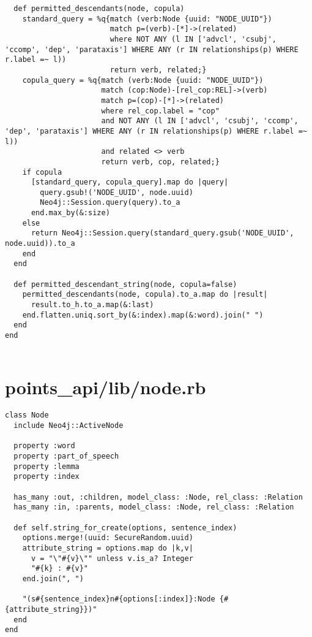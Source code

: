 \documentclass{article}
\begin{document}
\begin{verbatim}
  def permitted_descendants(node, copula)
    standard_query = %q{match (verb:Node {uuid: "NODE_UUID"})
                        match p=(verb)-[*]->(related)
                        where NOT ANY (l IN ['advcl', 'csubj', 'ccomp', 'dep', 'parataxis'] WHERE ANY (r IN relationships(p) WHERE r.label =~ l))
                        return verb, related;}
    copula_query = %q{match (verb:Node {uuid: "NODE_UUID"})
                      match (cop:Node)-[rel_cop:REL]->(verb)
                      match p=(cop)-[*]->(related)
                      where rel_cop.label = "cop"
                      and NOT ANY (l IN ['advcl', 'csubj', 'ccomp', 'dep', 'parataxis'] WHERE ANY (r IN relationships(p) WHERE r.label =~ l))
                      and related <> verb
                      return verb, cop, related;}
    if copula
      [standard_query, copula_query].map do |query|
        query.gsub!('NODE_UUID', node.uuid)
        Neo4j::Session.query(query).to_a
      end.max_by(&:size)
    else
      return Neo4j::Session.query(standard_query.gsub('NODE_UUID', node.uuid)).to_a
    end
  end

  def permitted_descendant_string(node, copula=false)
    permitted_descendants(node, copula).to_a.map do |result|
      result.to_h.to_a.map(&:last)
    end.flatten.uniq.sort_by(&:index).map(&:word).join(" ")
  end
end


\end{verbatim}
\pagebreak

\section*{points\_api/lib/node.rb}
\begin{verbatim}
class Node
  include Neo4j::ActiveNode

  property :word
  property :part_of_speech
  property :lemma
  property :index

  has_many :out, :children, model_class: :Node, rel_class: :Relation
  has_many :in, :parents, model_class: :Node, rel_class: :Relation

  def self.string_for_create(options, sentence_index)
    options.merge!(uuid: SecureRandom.uuid)
    attribute_string = options.map do |k,v|
      v = "\"#{v}\"" unless v.is_a? Integer
      "#{k} : #{v}"
    end.join(", ")

    "(s#{sentence_index}n#{options[:index]}:Node {#{attribute_string}})"
  end
end


\end{verbatim}
\pagebreak
\end{document}
